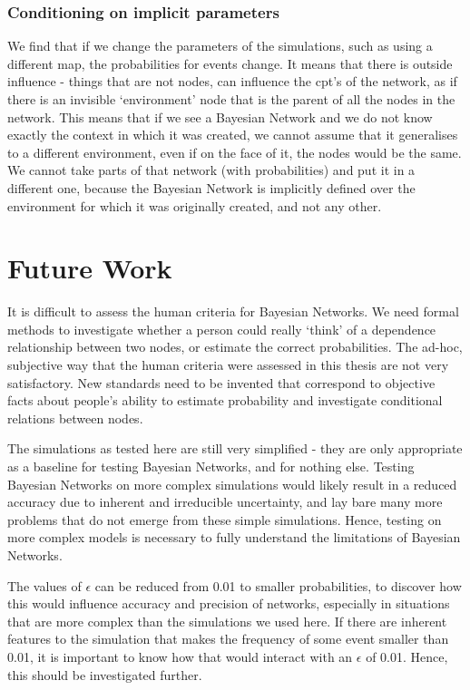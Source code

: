 \begin{itemize}
\subsubsection{Conditioning on implicit parameters}
We find that if we change the parameters of the simulations, such as using a different map, the probabilities for events change. It means that there is outside influence - things that are not nodes, can influence the cpt's of the network, as if there is an invisible `environment' node that is the parent of all the nodes in the network. This means that if we see a Bayesian Network and we do not know exactly the context in which it was created, we cannot assume that it generalises to a different environment, even if on the face of it, the nodes would be the same. We cannot take parts of that network (with probabilities) and put it in a different one, because the Bayesian Network is implicitly defined over the environment for which it was originally created, and not any other.

\end{itemize}





\section{Future Work}
It is difficult to assess the human criteria for Bayesian Networks. We need formal methods to investigate whether a person could really `think' of a dependence relationship between two nodes, or estimate the correct probabilities. The ad-hoc, subjective way that the human criteria were assessed in this thesis are not very satisfactory. New standards need to be invented that correspond to objective facts about people's ability to estimate probability and investigate conditional relations between nodes.

The simulations as tested here are still very simplified - they are only appropriate as a baseline for testing Bayesian Networks, and for nothing else. Testing Bayesian Networks on more complex simulations would likely result in a reduced accuracy due to inherent and irreducible uncertainty, and lay bare many more problems that do not emerge from these simple simulations. Hence, testing on more complex models is necessary to fully understand the limitations of Bayesian Networks.

The values of $\epsilon$ can be reduced from 0.01 to smaller probabilities, to discover how this would influence accuracy and precision of networks, especially in situations that are more complex than the simulations we used here. If there are inherent features to the simulation that makes the frequency of some event smaller than 0.01, it is important to know how that would interact with an $\epsilon$ of 0.01. Hence, this should be investigated further.

